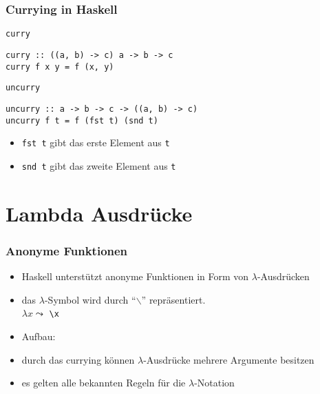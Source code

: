 \begin{frame}[fragile]
\frametitle{Currying in Haskell}
\begin{block}{\lstinline|curry|}
\begin{lstlisting}
curry :: ((a, b) -> c) a -> b -> c
curry f x y = f (x, y)
\end{lstlisting}
\end{block}
\pause
\begin{block}{\lstinline|uncurry|}
\begin{lstlisting}
uncurry :: a -> b -> c -> ((a, b) -> c)
uncurry f t = f (fst t) (snd t)
\end{lstlisting}
\end{block}
\pause
\begin{block}{\vspace*{-3ex}}
\begin{itemize}
  \item \lstinline|fst t| gibt das erste Element aus \lstinline|t|
  \item \lstinline|snd t| gibt das zweite Element aus \lstinline|t|
\end{itemize}
\end{block}
\end{frame}

\section{Lambda Ausdrücke}
\begin{frame}
\frametitle{Anonyme Funktionen}
\begin{block}{\vspace*{-3ex}}
\begin{itemize}
  \item Haskell unterstützt anonyme Funktionen in Form von $\lambda$-Ausdrücken
  \item das $\lambda$-Symbol wird durch "`$\backslash$"' repräsentiert.\\ $\lambda x \leadsto$ \lstinline|\x|
  \item Aufbau: \\
  \item durch das currying können $\lambda$-Ausdrücke mehrere Argumente besitzen
  \item es gelten alle bekannten Regeln für die $\lambda$-Notation
\end{itemize}
\begin{center}
\scalebox{0.8}{}
\end{center}
\end{block}
\end{frame}

